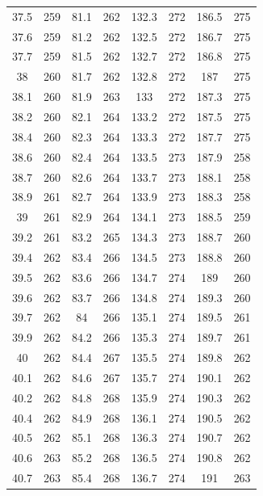 \documentclass[12pt]{ctexart}
\numberwithin{equation}{section}
\begin{document}
\begin{longtable}{cc|cc|cc|cc}
37.5  &  259  &  81.1  &  262  &  132.3  &  272  &  186.5  &  275  \\
37.6  &  259  &  81.2  &  262  &  132.5  &  272  &  186.7  &  275  \\
37.7  &  259  &  81.5  &  262  &  132.7  &  272  &  186.8  &  275  \\
38  &  260  &  81.7  &  262  &  132.8  &  272  &  187  &  275  \\
38.1  &  260  &  81.9  &  263  &  133  &  272  &  187.3  &  275  \\
38.2  &  260  &  82.1  &  264  &  133.2  &  272  &  187.5  &  275  \\
38.4  &  260  &  82.3  &  264  &  133.3  &  272  &  187.7  &  275  \\
38.6  &  260  &  82.4  &  264  &  133.5  &  273  &  187.9  &  258  \\
38.7  &  260  &  82.6  &  264  &  133.7  &  273  &  188.1  &  258  \\
38.9  &  261  &  82.7  &  264  &  133.9  &  273  &  188.3  &  258  \\
39  &  261  &  82.9  &  264  &  134.1  &  273  &  188.5  &  259  \\
39.2  &  261  &  83.2  &  265  &  134.3  &  273  &  188.7  &  260  \\
39.4  &  262  &  83.4  &  266  &  134.5  &  273  &  188.8  &  260  \\
39.5  &  262  &  83.6  &  266  &  134.7  &  274  &  189  &  260  \\
39.6  &  262  &  83.7  &  266  &  134.8  &  274  &  189.3  &  260  \\
39.7  &  262  &  84  &  266  &  135.1  &  274  &  189.5  &  261  \\
39.9  &  262  &  84.2  &  266  &  135.3  &  274  &  189.7  &  261  \\
40  &  262  &  84.4  &  267  &  135.5  &  274  &  189.8  &  262  \\
40.1  &  262  &  84.6  &  267  &  135.7  &  274  &  190.1  &  262  \\
40.2  &  262  &  84.8  &  268  &  135.9  &  274  &  190.3  &  262  \\
40.4  &  262  &  84.9  &  268  &  136.1  &  274  &  190.5  &  262  \\
40.5  &  262  &  85.1  &  268  &  136.3  &  274  &  190.7  &  262  \\
40.6  &  263  &  85.2  &  268  &  136.5  &  274  &  190.8  &  262  \\
40.7  &  263  &  85.4  &  268  &  136.7  &  274  &  191  &  263  \\

\end{longtable}
\end{document}
